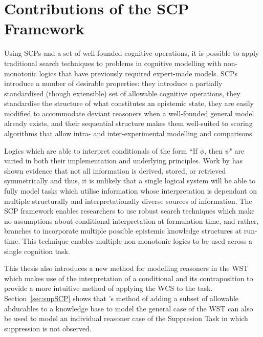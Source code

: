 \section{Contributions of the SCP Framework} \label{sec:contributions}
Using SCPs and a set of well-founded cognitive operations, it is possible to apply traditional search techniques to problems in cognitive modelling with non-monotonic logics that have previously required expert-made models. SCPs introduce a number of desirable properties: they introduce a partially standardised (though extensible) set of allowable cognitive operations, they standardise the structure of what constitutes an epistemic state, they are easily modified to accommodate deviant reasoners when a well-founded general model already exists, and their sequential structure makes them well-suited to scoring algorithms that allow intra- and inter-experimental modelling and comparisons.

Logics which are able to interpret conditionals of the form ``If $\phi$, then $\psi$" are varied in both their implementation and underlying principles. Work by \cite{heit2005defending} has shown evidence that not all information is derived, stored, or retrieved symmetrically and thus, it is unlikely that a single logical system will be able to fully model tasks which utilise information whose interpretation is dependant on multiple structurally and interpretationally diverse sources of information. The SCP framework enables researchers to use robust search techniques which make no assumptions about conditional interpretation at formulation time, and rather, branches to incorporate multiple possible epistemic knowledge structures at run-time. This technique enables multiple non-monotonic logics to be used across a single cognition task.

This thesis also introduces a new method for modelling reasoners in the WST which makes use of the interpretation of a conditional and its contraposition to provide a more intuitive method of applying the WCS to the task. Section~\ref{sec:supSCP} shows that \cite{dietz2014modeling}'s method of adding a subset of allowable abducables to a knowledge base to model the general case of the WST can also be used to model an individual reasoner case of the Suppresion Task in which suppression is not observed.

